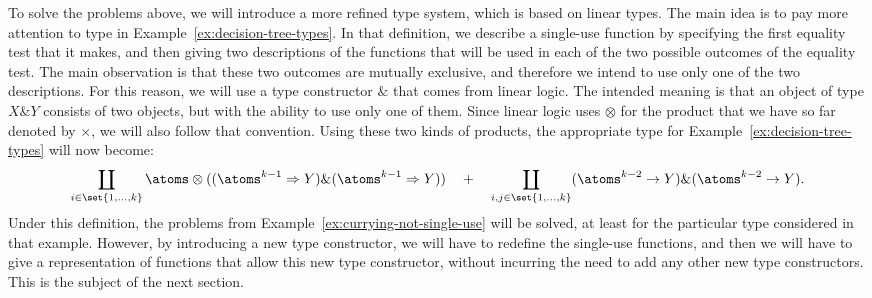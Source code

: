 To solve the problems above, we will introduce a more refined type system, which is based on linear types.  The main idea is to pay more attention to type  in Example~\ref{ex:decision-tree-types}. In that definition, we describe a single-use function by specifying the first equality test that it makes, and then giving two descriptions of the functions that will be used in each of the two possible outcomes of the equality test. The main observation is that these two outcomes are mutually exclusive, and therefore we intend to use only one of the two descriptions. For this reason, we will use a  type constructor $\&$ that comes from linear logic. The intended meaning is  that an object of type $X \& Y$ consists of two objects, but with the ability to use only one of them. Since linear logic uses $\otimes$  for the  product that we have so far denoted by $\times$, we will also follow that convention. Using these two kinds of products, the appropriate type for Example~\ref{ex:decision-tree-types} will now become:
\begin{align*}
\coprod_{i \in \set{1,\ldots,k}} 
        \atoms \otimes ((\atoms^{k-1} \Rightarrow Y) \& (\atoms^{k-1} \Rightarrow Y))
          \quad + \quad 
    \coprod_{i, j \in \set{1,\ldots,k}} (\atoms^{k-2} \to Y) \& (\atoms^{k-2} \to Y).
    \end{align*}
Under this definition, the problems from Example~\ref{ex:currying-not-single-use} will be solved, at least for the particular type considered in that example. However, by introducing a new type constructor, we will have to redefine the single-use functions, and then we will have to give a representation of functions that allow this new type constructor, without incurring the need to add any other new type constructors. This is the subject of the next section.

